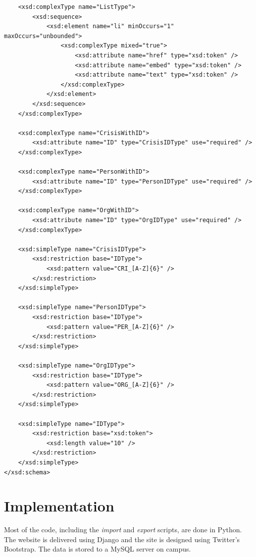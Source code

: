 \documentclass[12pt]{report}
\begin{document}
\begin{lstlisting}
    <xsd:complexType name="ListType">
        <xsd:sequence>
            <xsd:element name="li" minOccurs="1" maxOccurs="unbounded">
                <xsd:complexType mixed="true">
                    <xsd:attribute name="href" type="xsd:token" />
                    <xsd:attribute name="embed" type="xsd:token" />
                    <xsd:attribute name="text" type="xsd:token" />
                </xsd:complexType>
            </xsd:element>
        </xsd:sequence>
    </xsd:complexType>

    <xsd:complexType name="CrisisWithID">
        <xsd:attribute name="ID" type="CrisisIDType" use="required" />
    </xsd:complexType>
    
    <xsd:complexType name="PersonWithID">
        <xsd:attribute name="ID" type="PersonIDType" use="required" />
    </xsd:complexType>
    
    <xsd:complexType name="OrgWithID">
        <xsd:attribute name="ID" type="OrgIDType" use="required" />
    </xsd:complexType>

    <xsd:simpleType name="CrisisIDType">
        <xsd:restriction base="IDType">
            <xsd:pattern value="CRI_[A-Z]{6}" />
        </xsd:restriction>
    </xsd:simpleType>
    
    <xsd:simpleType name="PersonIDType">
        <xsd:restriction base="IDType">
            <xsd:pattern value="PER_[A-Z]{6}" />
        </xsd:restriction>
    </xsd:simpleType>
    
    <xsd:simpleType name="OrgIDType">
        <xsd:restriction base="IDType">
            <xsd:pattern value="ORG_[A-Z]{6}" />
        </xsd:restriction>
    </xsd:simpleType>

    <xsd:simpleType name="IDType">
        <xsd:restriction base="xsd:token">
            <xsd:length value="10" />
        </xsd:restriction>
    </xsd:simpleType>
</xsd:schema>
\end{lstlisting}

\newpage
\section*{Implementation}

\hfill \newline
Most of the code, including the \emph{import} and \emph{export} scripts, are done in Python.
The website is delivered using Django and the site is designed using Twitter's Bootstrap.
The data is stored to a MySQL server on campus.
\newline
\end{document}
